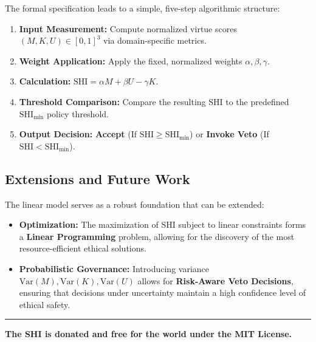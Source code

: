 \documentclass[12pt, a4paper]{article}
\begin{document}
The formal specification leads to a simple, five-step algorithmic structure:
\begin{enumerate}
    \item \textbf{Input Measurement:} Compute normalized virtue scores $(M, K, U) \in [0, 1]^3$ via domain-specific metrics.
    \item \textbf{Weight Application:} Apply the fixed, normalized weights $\alpha, \beta, \gamma$.
    \item \textbf{Calculation:} $\text{SHI} = \alpha M + \beta U - \gamma K$.
    \item \textbf{Threshold Comparison:} Compare the resulting $\text{SHI}$ to the predefined $\text{SHI}_{\min}$ policy threshold.
    \item \textbf{Output Decision:} \textbf{Accept} (If $\text{SHI} \geq \text{SHI}_{\min}$) or \textbf{Invoke Veto} (If $\text{SHI} < \text{SHI}_{\min}$).
\end{enumerate}

\subsection{Extensions and Future Work}

The linear model serves as a robust foundation that can be extended:
\begin{itemize}
    \item \textbf{Optimization:} The maximization of SHI subject to linear constraints forms a \textbf{Linear Programming} problem, allowing for the discovery of the most resource-efficient ethical solutions.
    \item \textbf{Probabilistic Governance:} Introducing variance $\text{Var}(M), \text{Var}(K), \text{Var}(U)$ allows for \textbf{Risk-Aware Veto Decisions}, ensuring that decisions under uncertainty maintain a high confidence level of ethical safety.
\end{itemize}

\hrule
\vspace{0.2in}
\textbf{The SHI is donated and free for the world under the MIT License.}
\end{document}
